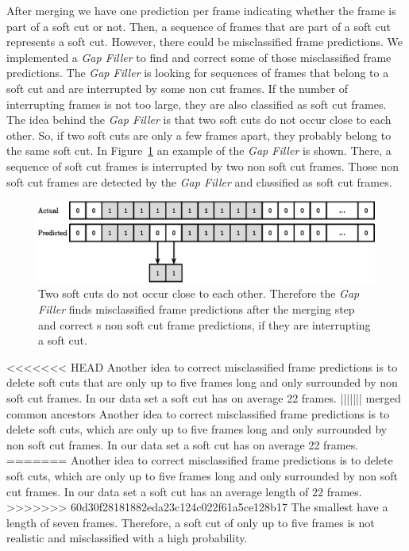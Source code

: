 After merging we have one prediction per frame indicating whether the frame is part of a soft cut or not.
Then, a sequence of frames that are part of a soft cut represents a soft cut.
However, there could be misclassified frame predictions.
We implemented a \textit{Gap Filler} to find and correct some of those misclassified frame predictions.
The \textit{Gap Filler} is looking for sequences of frames that belong to a soft cut and are interrupted by some non cut frames.
If the number of interrupting frames is not too large, they are also classified as soft cut frames.
The idea behind the \textit{Gap Filler} is that two soft cuts do not occur close to each other.
So, if two soft cuts are only a few frames apart, they probably belong to the same soft cut.
In Figure~\ref{fig:gap_filler} an example of the \textit{Gap Filler} is shown.
There, a sequence of soft cut frames is interrupted by two non soft cut frames.
Those non soft cut frames are detected by the \textit{Gap Filler} and classified as soft cut frames.
\begin{figure}[!htb]
	\centering
	\includegraphics[scale=.7]{images/gap_filler.eps}
	\caption{Two soft cuts do not occur close to each other. Therefore the \textit{Gap Filler} finds misclassified frame predictions after the merging step and correct s non soft cut frame predictions, if they are interrupting a soft cut.}
	\label{fig:gap_filler}
\end{figure}

<<<<<<< HEAD
Another idea to correct misclassified frame predictions is to delete soft cuts that are only up to five frames long and only surrounded by non soft cut frames.
In our data set a soft cut has on average 22 frames.
||||||| merged common ancestors
Another idea to correct misclassified frame predictions is to delete soft cuts, which are only up to five frames long and only surrounded by non soft cut frames.
In our data set a soft cut has on average 22 frames.
=======
Another idea to correct misclassified frame predictions is to delete soft cuts, which are only up to five frames long and only surrounded by non soft cut frames.
In our data set a soft cut has an average length of 22 frames.
>>>>>>> 60d30f28181882eda23c124c022f61a5ce128b17
The smallest have a length of seven frames.
Therefore, a soft cut of only up to five frames is not realistic and misclassified with a high probability.

